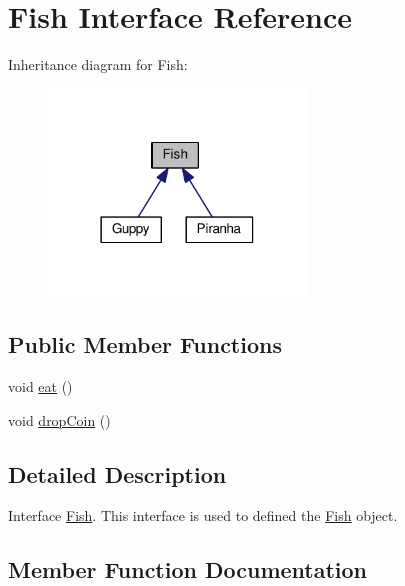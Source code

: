 \hypertarget{interface_fish}{}\section{Fish Interface Reference}
\label{interface_fish}


Inheritance diagram for Fish\+:
\nopagebreak
\begin{figure}[H]
\begin{center}
\leavevmode
\includegraphics[width=194pt]{interface_fish__inherit__graph}
\end{center}
\end{figure}
\subsection*{Public Member Functions}
\begin{DoxyCompactItemize}
\item 
void \mbox{\hyperlink{interface_fish_a72d533bdc4ac39f4ffd93d70504efed8}{eat}} ()
\item 
void \mbox{\hyperlink{interface_fish_ad37facd4d5859411cf433520f03ae0b8}{drop\+Coin}} ()
\end{DoxyCompactItemize}


\subsection{Detailed Description}
Interface \mbox{\hyperlink{interface_fish}{Fish}}. This interface is used to defined the \mbox{\hyperlink{interface_fish}{Fish}} object. 

\subsection{Member Function Documentation}
\mbox{\label{interface_fish_ad37facd4d5859411cf433520f03ae0b8}} 
